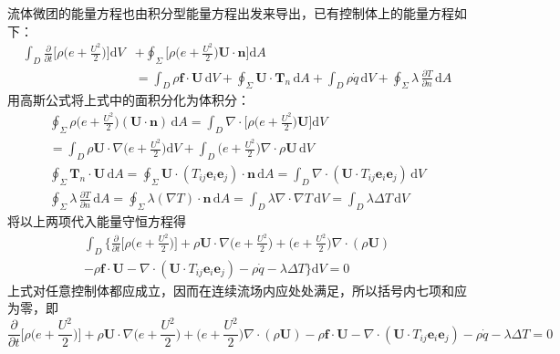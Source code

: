 流体微团的能量方程也由积分型能量方程出发来导出，已有控制体上的能量方程如下：
\begin{align*}
\int_D \frac{\partial}{\partial t}\bigg[\rho\Big(e+\frac{U^{2}}{2}\Big)\bigg]\mathrm{d}V&+\oint_\Sigma \bigg[\rho\Big(e+\frac{U^{2}}{2}\Big)\boldsymbol{U}\cdot\boldsymbol{n}\bigg]\mathrm{d}A\\
&=\int_D \rho\boldsymbol{f}\cdot\boldsymbol{U}\,\mathrm{d}V+\oint_\Sigma \boldsymbol{U}\cdot\boldsymbol{T}_n\,\mathrm{d}A+\int_D \rho\dot{q}\,\mathrm{d}V+\oint_\Sigma \lambda\,\frac{\partial T}{\partial n}\,\mathrm{d}A
\end{align*}
用高斯公式将上式中的面积分化为体积分：
\begin{gather*}
\oint_\Sigma \rho\Big(e+\frac{U^{2}}{2}\Big)(\boldsymbol{U}\cdot\boldsymbol{n})\,\mathrm{d}A=\int_D \nabla\cdot\bigg[\rho\Big(e+\frac{U^{2}}{2}\Big)\boldsymbol{U}\bigg]\mathrm{d}V\\
=\int_D \rho\boldsymbol{U}\cdot\nabla\Big(e+\frac{U^{2}}{2}\Big)\mathrm{d}V+\int_D \Big(e+\frac{U^{2}}{2}\Big)\nabla\cdot\rho\boldsymbol{U}\,\mathrm{d}V\\[2pt]
\oint_\Sigma \boldsymbol{T}_n\cdot\boldsymbol{U}\,\mathrm{d}A=\oint_\Sigma \boldsymbol{U}\cdot(T_{ij}\boldsymbol{e}_i\boldsymbol{e}_j)\cdot\boldsymbol{n}\,\mathrm{d}A=\int_D \nabla\cdot(\boldsymbol{U}\cdot T_{ij}\boldsymbol{e}_i\boldsymbol{e}_j)\,\mathrm{d}V\\[2pt]
\oint_\Sigma \lambda\,\frac{\partial T}{\partial n}\,\mathrm{d}A=\oint_\Sigma \lambda(\nabla T)\cdot\boldsymbol{n}\,\mathrm{d}A=\int_D \lambda\nabla\cdot\nabla T\,\mathrm{d}V=\int_D \lambda\Delta T\,\mathrm{d}V
\end{gather*}
将以上两项代入能量守恒方程得
\begin{align*}
\int_D \bigg\{\frac{\partial}{\partial t}\bigg[\rho\Big(e+\frac{U^{2}}{2}\Big)\bigg]+\rho\boldsymbol{U}\cdot\nabla\Big(e+\frac{U^{2}}{2}\Big)+\Big(e+\frac{U^{2}}{2}\Big)\nabla\cdot(\rho\boldsymbol{U})\\
-\rho\boldsymbol{f}\cdot\boldsymbol{U}-\nabla\cdot(\boldsymbol{U}\cdot T_{ij}\boldsymbol{e}_i\boldsymbol{e}_j)-\rho\dot{q}-\lambda\Delta T\bigg\}\mathrm{d}V=0
\end{align*}
上式对任意控制体都应成立，因而在连续流场内应处处满足，所以括号内七项和应为零，即
\[
\frac{\partial}{\partial t}\bigg[\rho\Big(e+\frac{U^{2}}{2}\Big)\bigg]+\rho\boldsymbol{U}\cdot\nabla\Big(e+\frac{U^{2}}{2}\Big)+\Big(e+\frac{U^{2}}{2}\Big)\nabla\cdot(\rho\boldsymbol{U})-\rho\boldsymbol{f}\cdot\boldsymbol{U}-\nabla\cdot(\boldsymbol{U}\cdot T_{ij}\boldsymbol{e}_i\boldsymbol{e}_j)-\rho\dot{q}-\lambda\Delta T=0
\]
